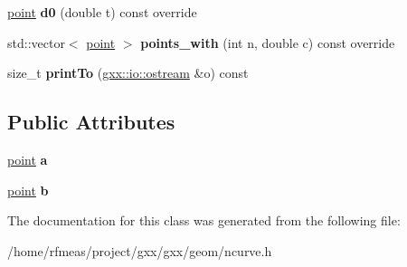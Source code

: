 \begin{DoxyCompactItemize}
\item 
\hyperlink{classgxx_1_1ngeom_1_1point}{point} {\bfseries d0} (double t) const override\hypertarget{classgxx_1_1ngeom_1_1line_a4c2eb3119f581672491e541303fb6b30}{}\label{classgxx_1_1ngeom_1_1line_a4c2eb3119f581672491e541303fb6b30}

\item 
std\+::vector$<$ \hyperlink{classgxx_1_1ngeom_1_1point}{point} $>$ {\bfseries points\+\_\+with} (int n, double c) const override\hypertarget{classgxx_1_1ngeom_1_1line_ac8ae38e407f31dd5b4d8a87352ef3eb7}{}\label{classgxx_1_1ngeom_1_1line_ac8ae38e407f31dd5b4d8a87352ef3eb7}

\item 
size\+\_\+t {\bfseries print\+To} (\hyperlink{classgxx_1_1io_1_1ostream}{gxx\+::io\+::ostream} \&o) const \hypertarget{classgxx_1_1ngeom_1_1line_aecf9453d833510c832a127c27575ca57}{}\label{classgxx_1_1ngeom_1_1line_aecf9453d833510c832a127c27575ca57}

\end{DoxyCompactItemize}
\subsection*{Public Attributes}
\begin{DoxyCompactItemize}
\item 
\hyperlink{classgxx_1_1ngeom_1_1point}{point} {\bfseries a}\hypertarget{classgxx_1_1ngeom_1_1line_ae9dc89e70b6786382e56e69e44c61214}{}\label{classgxx_1_1ngeom_1_1line_ae9dc89e70b6786382e56e69e44c61214}

\item 
\hyperlink{classgxx_1_1ngeom_1_1point}{point} {\bfseries b}\hypertarget{classgxx_1_1ngeom_1_1line_a93c7c65139b82c88db0993767eb65f6f}{}\label{classgxx_1_1ngeom_1_1line_a93c7c65139b82c88db0993767eb65f6f}

\end{DoxyCompactItemize}


The documentation for this class was generated from the following file\+:\begin{DoxyCompactItemize}
\item 
/home/rfmeas/project/gxx/gxx/geom/ncurve.\+h\end{DoxyCompactItemize}
